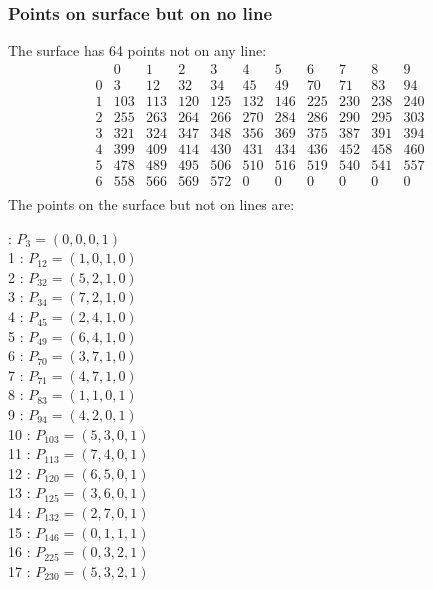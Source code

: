 \documentclass{article}
\begin{document}
{\subsubsection*{Points on surface but on no line}
The surface has 64 points not on any line:\\
$$
\begin{array}{r|*{10}{r}}
 & 0 & 1 & 2 & 3 & 4 & 5 & 6 & 7 & 8 & 9\\
\hline
0 & 3 & 12 & 32 & 34 & 45 & 49 & 70 & 71 & 83 & 94\\
1 & 103 & 113 & 120 & 125 & 132 & 146 & 225 & 230 & 238 & 240\\
2 & 255 & 263 & 264 & 266 & 270 & 284 & 286 & 290 & 295 & 303\\
3 & 321 & 324 & 347 & 348 & 356 & 369 & 375 & 387 & 391 & 394\\
4 & 399 & 409 & 414 & 430 & 431 & 434 & 436 & 452 & 458 & 460\\
5 & 478 & 489 & 495 & 506 & 510 & 516 & 519 & 540 & 541 & 557\\
6 & 558 & 566 & 569 & 572 & 0 & 0 & 0 & 0 & 0 & 0\\
\end{array}
$$
The points on the surface but not on lines are:\\
\begin{multicols}{2}
 : $P_{3}=( 0, 0, 0, 1 )$\\
1 : $P_{12}=( 1, 0, 1, 0 )$\\
2 : $P_{32}=( 5, 2, 1, 0 )$\\
3 : $P_{34}=( 7, 2, 1, 0 )$\\
4 : $P_{45}=( 2, 4, 1, 0 )$\\
5 : $P_{49}=( 6, 4, 1, 0 )$\\
6 : $P_{70}=( 3, 7, 1, 0 )$\\
7 : $P_{71}=( 4, 7, 1, 0 )$\\
8 : $P_{83}=( 1, 1, 0, 1 )$\\
9 : $P_{94}=( 4, 2, 0, 1 )$\\
10 : $P_{103}=( 5, 3, 0, 1 )$\\
11 : $P_{113}=( 7, 4, 0, 1 )$\\
12 : $P_{120}=( 6, 5, 0, 1 )$\\
13 : $P_{125}=( 3, 6, 0, 1 )$\\
14 : $P_{132}=( 2, 7, 0, 1 )$\\
15 : $P_{146}=( 0, 1, 1, 1 )$\\
16 : $P_{225}=( 0, 3, 2, 1 )$\\
17 : $P_{230}=( 5, 3, 2, 1 )$\\

\end{multicols}}
\end{document}
